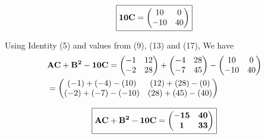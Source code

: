 \documentclass[journal,12pt,twocolumn]{IEEEtran}
\begin{document}
      \begin{equation}
      \boxed{\mathbf{10C}=
     \begin{pmatrix} 
        10 & 0 \\
        -10 & 40
      \end{pmatrix} 
      }
    \end{equation}
  
    
    Using Identity (5) and values from (9), (13) and (17), We have
    \begin{align}
      &\mathbf{AC+B^2-10C}= 
     \begin{pmatrix} 
        -1 & 12 \\
        -2 & 28
      \end{pmatrix} 
      +
     \begin{pmatrix} 
        -4 & 28 \\
        -7 & 45
      \end{pmatrix} 
      -
     \begin{pmatrix} 
        10 & 0 \\
        -10 & 40
      \end{pmatrix} 
    \\
    &=
     \begin{pmatrix} 
        (-1)+(-4)-(10) & (12)+(28)-(0) \\
        (-2)+(-7)-(-10) & (28)+(45)-(40)
      \end{pmatrix} 
    \end{align}
    
    \begin{equation}
      \boxed{\mathbf{\mathbf{AC+B^2-10C}} =
       \begin{pmatrix} 
          \mathbf{-15} & \mathbf{40} \\
          \mathbf{1} & \mathbf{33}
        \end{pmatrix} 
        }  
    \end{equation}
\end{document}
